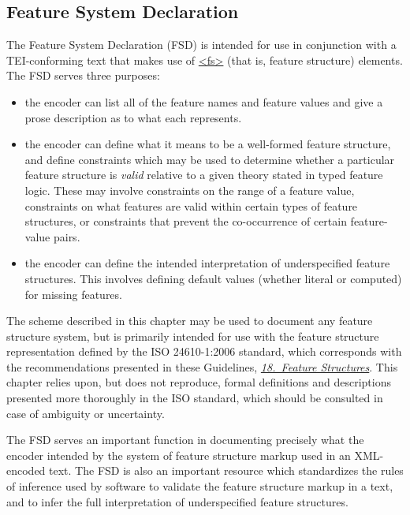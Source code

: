 \subsection[{Feature System Declaration}]{Feature System Declaration}\label{FD}\par
The Feature System Declaration (FSD) is intended for use in conjunction with a TEI-conforming text that makes use of \hyperref[TEI.fs]{<fs>} (that is, feature structure) elements. The FSD serves three purposes: \begin{itemize}
\item the encoder can list all of the feature names and feature values and give a prose description as to what each represents.
\item the encoder can define what it means to be a well-formed feature structure, and define constraints which may be used to determine whether a particular feature structure is \textit{valid} relative to a given theory stated in typed feature logic. These may involve constraints on the range of a feature value, constraints on what features are valid within certain types of feature structures, or constraints that prevent the co-occurrence of certain feature-value pairs.
\item the encoder can define the intended interpretation of underspecified feature structures. This involves defining default values (whether literal or computed) for missing features.
\end{itemize} \par
The scheme described in this chapter may be used to document any feature structure system, but is primarily intended for use with the feature structure representation defined by the ISO 24610-1:2006 standard, which corresponds with the recommendations presented in these Guidelines, \textit{\hyperref[FS]{18.\ Feature Structures}}. This chapter relies upon, but does not reproduce, formal definitions and descriptions presented more thoroughly in the ISO standard, which should be consulted in case of ambiguity or uncertainty.\par
The FSD serves an important function in documenting precisely what the encoder intended by the system of feature structure markup used in an XML-encoded text. The FSD is also an important resource which standardizes the rules of inference used by software to validate the feature structure markup in a text, and to infer the full interpretation of underspecified feature structures.\par
